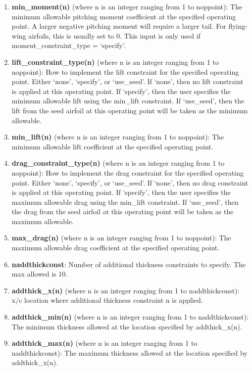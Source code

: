 \documentclass[11pt]{article}
\begin{document}
\begin{enumerate}
\item{\textbf{min\_moment(n)} (where n is an integer ranging from 1 to noppoint): The 
	minimum allowable pitching moment coefficient at the specified operating point.  A larger
	negative pitching moment will require a larger tail.  For flying-wing airfoils, this is 
	usually set to 0.  This input is only used if moment\_constraint\_type = `specify'.} 

\item{\textbf{lift\_constraint\_type(n)} (where n is an integer ranging from 1 to
	noppoint): How to implement the lift constraint for the specified operating
	point. Either `none', `specify', or `use\_seed'.  If `none', then no lift 
	constraint is applied at this operating point.  If `specify', then the user specifies the 
	minimum allowable lift using the min\_lift constraint.  If `use\_seed', then the 
	lift from the seed airfoil at this operating point will be taken as the minimum
	allowable.}

\item{\textbf{min\_lift(n)} (where n is an integer ranging from 1 to noppoint): The 
	minimum allowable lift coefficient at the specified operating point.} 

\item{\textbf{drag\_constraint\_type(n)} (where n is an integer ranging from 1 to
	noppoint): How to implement the drag constraint for the specified operating
	point. Either `none', `specify', or `use\_seed'.  If `none', then no drag 
	constraint is applied at this operating point.  If `specify', then the user specifies the 
	maximum allowable drag using the min\_lift constraint.  If `use\_seed', then the 
	drag from the seed airfoil at this operating point will be taken as the maximum
	allowable.}

\item{\textbf{max\_drag(n)} (where n is an integer ranging from 1 to noppoint): The 
	maximum allowable drag coefficient at the specified operating point.} 

\item{\textbf{naddthickconst}: Number of additional thickness constraints to specify. The
max allowed is 10.}

\item{\textbf{addthick\_x(n)} (where n is an integer ranging from 1 to naddthickconst):
x/c location where additional thickness constraint n is applied.}

\item{\textbf{addthick\_min(n)} (where n is an integer ranging from 1 to naddthickconst):
The minimum thickness allowed at the location specified by addthick\_x(n).}

\item{\textbf{addthick\_max(n)} (where n is an integer ranging from 1 to naddthickconst):
The maximum thickness allowed at the location specified by addthick\_x(n).}
\end{enumerate}
\end{document}
